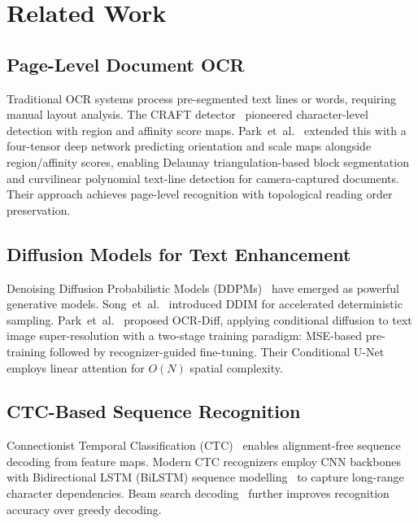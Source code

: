 \documentclass[conference]{IEEEtran}
\begin{document}
\section{Related Work}

\subsection{Page-Level Document OCR}
Traditional OCR systems process pre-segmented text lines or words, requiring manual layout analysis. The CRAFT detector~\cite{baek2019craft} pioneered character-level detection with region and affinity score maps. Park~et~al.~\cite{park2025pagelevel} extended this with a four-tensor deep network predicting orientation and scale maps alongside region/affinity scores, enabling Delaunay triangulation-based block segmentation and curvilinear polynomial text-line detection for camera-captured documents. Their approach achieves page-level recognition with topological reading order preservation.

\subsection{Diffusion Models for Text Enhancement}
Denoising Diffusion Probabilistic Models (DDPMs)~\cite{ho2020ddpm} have emerged as powerful generative models. Song~et~al.~\cite{song2020ddim} introduced DDIM for accelerated deterministic sampling. Park~et~al.~\cite{park2024ocrdiff} proposed OCR-Diff, applying conditional diffusion to text image super-resolution with a two-stage training paradigm: MSE-based pre-training followed by recognizer-guided fine-tuning. Their Conditional U-Net employs linear attention for $O(N)$ spatial complexity.

\subsection{CTC-Based Sequence Recognition}
Connectionist Temporal Classification (CTC)~\cite{graves2006ctc} enables alignment-free sequence decoding from feature maps. Modern CTC recognizers employ CNN backbones with Bidirectional LSTM (BiLSTM) sequence modelling~\cite{shi2017crnn} to capture long-range character dependencies. Beam search decoding~\cite{hwang2016beam} further improves recognition accuracy over greedy decoding.

\end{document}
